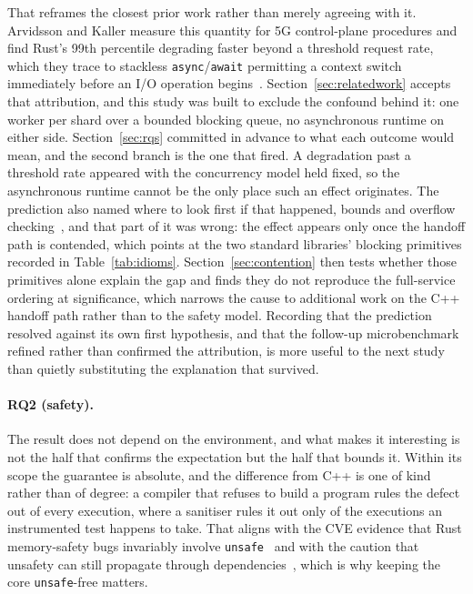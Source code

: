 \documentclass[english,twoside,openright,a4paper,censored,csm,software-track-2020]{HYthesisML}
\begin{document}
That reframes the closest prior work rather than merely agreeing with it. Arvidsson and Kaller
measure this quantity for 5G control-plane procedures and find Rust's 99th percentile degrading
faster beyond a threshold request rate, which they trace to stackless
\texttt{async}/\texttt{await} permitting a context switch immediately before an I/O operation
begins~\cite{arvidsson2025async}. Section~\ref{sec:relatedwork} accepts that attribution, and
this study was built to exclude the confound behind it: one worker per shard over a bounded
blocking queue, no asynchronous runtime on either side. Section~\ref{sec:rqs}
committed in advance to what each outcome would mean, and the second branch is the one that
fired. A degradation past a threshold rate appeared with the concurrency model held fixed, so the
asynchronous runtime cannot be the only place such an effect originates. The prediction also
named where to look first if that happened, bounds and overflow
checking~\cite{zhang2022runtime,harris2023morello}, and that part of it was wrong: the effect
appears only once the handoff path is contended, which points at the two standard libraries'
blocking primitives recorded in Table~\ref{tab:idioms}. Section~\ref{sec:contention} then tests
whether those primitives alone explain the gap and finds they do not reproduce the full-service
ordering at significance, which narrows the cause to additional work on the C++ handoff path
rather than to the safety model. Recording that the prediction resolved against its own first
hypothesis, and that the follow-up microbenchmark refined rather than confirmed the attribution,
is more useful to the next study than quietly substituting the explanation that survived.

\paragraph{RQ2 (safety).} The result does not depend on the environment, and what makes it
interesting is not the half that confirms the expectation but the half that bounds it. Within
its scope the guarantee is absolute, and the difference from C++ is one of kind rather than of
degree: a compiler that refuses to build a program rules the defect out of every execution,
where a sanitiser rules it out only of the executions an instrumented test happens to take.
That aligns with the CVE evidence that Rust memory-safety bugs invariably involve
\texttt{unsafe}~\cite{xu2021rustcve} and with the caution that unsafety can still propagate
through dependencies~\cite{evans2020rust}, which is why keeping the core \texttt{unsafe}-free
matters.
\end{document}
